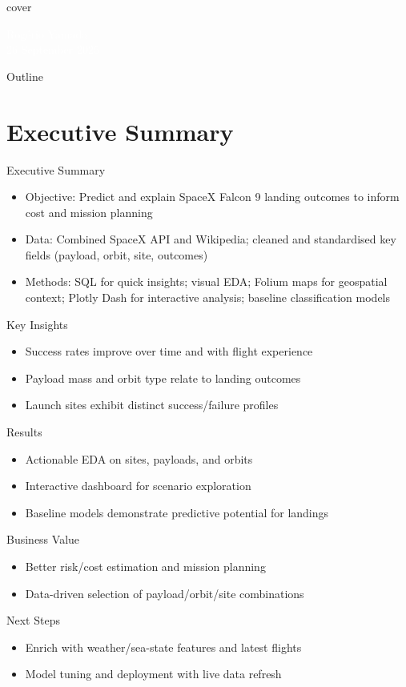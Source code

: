 {
{cover}
\begin{frame}
    \vspace{5cm}
    \textcolor{white}{Rogério Yamada \\ 26 September 2025}
\end{frame}
}

\begin{frame}{Outline}
    \tableofcontents
\end{frame}

\section{Executive Summary}

\begin{frame}[allowframebreaks]{Executive Summary}
    \begin{itemize}
        \item Objective: Predict and explain SpaceX Falcon 9 landing outcomes to inform cost and mission planning
        \item Data: Combined SpaceX API and Wikipedia; cleaned and standardised key fields (payload, orbit, site, outcomes)
        \item Methods: SQL for quick insights; visual EDA; Folium maps for geospatial context; Plotly Dash for interactive analysis; baseline classification models
    \end{itemize}
    \large Key Insights
    \begin{itemize}
        \item Success rates improve over time and with flight experience
        \item Payload mass and orbit type relate to landing outcomes
        \item Launch sites exhibit distinct success/failure profiles
    \end{itemize}
    \framebreak
    \large Results
    \begin{itemize}
        \item Actionable EDA on sites, payloads, and orbits
        \item Interactive dashboard for scenario exploration
        \item Baseline models demonstrate predictive potential for landings
    \end{itemize}
    \large Business Value
    \begin{itemize}
        \item Better risk/cost estimation and mission planning
        \item Data-driven selection of payload/orbit/site combinations
    \end{itemize}
    \large Next Steps
    \begin{itemize}
        \item Enrich with weather/sea-state features and latest flights
        \item Model tuning and deployment with live data refresh
    \end{itemize}
\end{frame}

